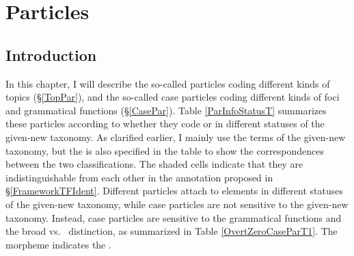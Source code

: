 \chapter{Particles}\label{Particles}



\section{Introduction}\label{ParIntro}

In this chapter, I will describe
the so-called  particles coding different kinds of topics (\S \ref{TopPar}),
and the so-called case particles coding different kinds of foci and grammatical functions (\S \ref{CasePar}). Table \ref{ParInfoStatusT} summarizes these particles according to whether they code  or  in different statuses of the given-new taxonomy.
As clarified earlier, I mainly use the terms of the given-new taxonomy, but the  is also specified in the table to show the correspondences between the two classifications.
The shaded cells indicate that they are indistinguishable from each other in the annotation proposed in \S \ref{FrameworkTFIdent}.
Different  particles attach to elements in different statuses of the given-new taxonomy,
while case particles are not sensitive to the given-new taxonomy.
Instead, case particles are sensitive to the grammatical functions and the broad vs.\  distinction,
as summarized in Table \ref{OvertZeroCaseParT1}.
The morpheme  indicates the .

